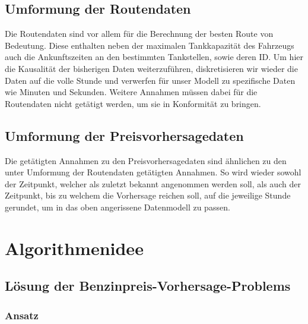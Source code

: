 \documentclass[11pt]{article}
\begin{document}
\subsection{Umformung der Routendaten}
	Die Routendaten sind vor allem für die Berechnung der besten Route von Bedeutung. Diese enthalten neben der maximalen Tankkapazität des Fahrzeugs auch die Ankunftszeiten an den bestimmten Tankstellen, sowie deren ID. Um hier die Kausalität der bisherigen Daten weiterzuführen, diskretisieren wir wieder die Daten auf die volle Stunde und verwerfen für unser Modell zu spezifische  Daten wie Minuten und Sekunden. Weitere Annahmen müssen dabei für die Routendaten nicht getätigt werden, um sie in Konformität zu bringen.
\subsection{Umformung der Preisvorhersagedaten}
	Die getätigten Annahmen zu den Preisvorhersagedaten sind ähnlichen zu den unter \glqq Umformung der Routendaten\grqq{} getätigten Annahmen. So wird wieder sowohl der Zeitpunkt, welcher als zuletzt bekannt angenommen werden soll, als auch der Zeitpunkt, bis zu welchem die Vorhersage reichen soll, auf die jeweilige Stunde gerundet, um in das oben angerissene Datenmodell zu passen.



\section{Algorithmenidee}
\subsection{Lösung der Benzinpreis-Vorhersage-Problems}
\subsubsection{Ansatz}
	
\end{document}

